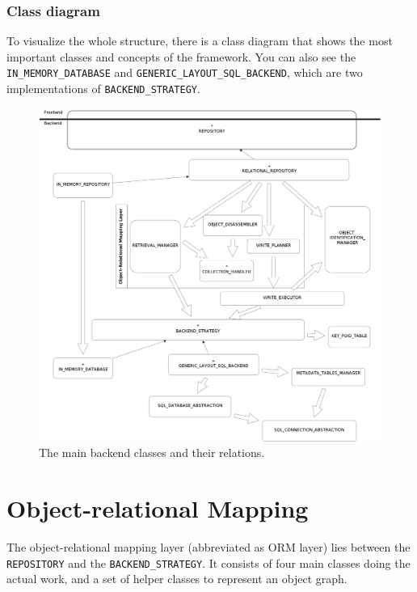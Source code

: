 \subsubsection{Class diagram}

To visualize the whole structure, there is a class diagram that shows the most important classes and concepts of the framework. 
You can also see the \lstinline!IN_MEMORY_DATABASE! and \lstinline!GENERIC_LAYOUT_SQL_BACKEND!, which are two implementations of \lstinline!BACKEND_STRATEGY!.

\begin{figure} [h]
\centering
\includegraphics[trim= 0mm -10mm 0mm -10mm,clip, width = 13cm] {includes/backend.png}
\caption{The main backend classes and their relations.}
\label{fig:backend_classes}
\end{figure}


\section{Object-relational Mapping}
\label{section:ORM}

The object-relational mapping layer (abbreviated as ORM layer) lies between the \lstinline!REPOSITORY! and the \lstinline!BACKEND_STRATEGY!.
It consists of four main classes doing the actual work, and a set of helper classes to represent an object graph.

